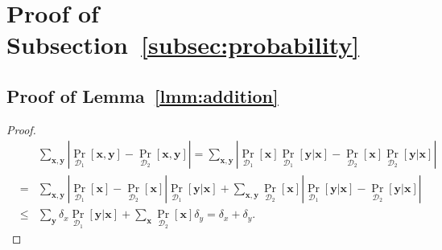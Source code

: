 \documentclass[letterpaper,11pt]{article}
\newcommand{\cald}{\mathcal{D}}
\newcommand{\bfx}{\mathbf{x}}
\newcommand{\bfy}{\mathbf{y}}
\begin{document}
{}

\newpage
\appendix
\noindent {\bf\Large \appendixname}

\section{Proof of Subsection~\ref{subsec:probability}}\label{apx:probability}

\subsection{Proof of Lemma~\ref{lmm:addition}}
\begin{proof}
  \begin{eqnarray*}
    &&
    \sum_{\bfx,\bfy}\left|\Pr_{\cald_1}[\bfx,\bfy]-\Pr_{\cald_2}[\bfx,\bfy]\right|
    =
    \sum_{\bfx,\bfy}\left|\Pr_{\cald_1}[\bfx]\Pr_{\cald_1}[\bfy|\bfx]-\Pr_{\cald_2}[\bfx]\Pr_{\cald_2}[\bfy|\bfx]\right|\\
    &=&
    \sum_{\bfx,\bfy}\left|\Pr_{\cald_1}[\bfx]-\Pr_{\cald_2}[\bfx]\right|\Pr_{\cald_1}[\bfy|\bfx]
    +\sum_{\bfx,\bfy}\Pr_{\cald_2}[\bfx]\left|\Pr_{\cald_1}[\bfy|\bfx]-\Pr_{\cald_2}[\bfy|\bfx]\right|\\
    &\leq&
    \sum_{\bfy}\delta_x \Pr_{\cald_1}[\bfy|\bfx] + \sum_{\bfx}\Pr_{\cald_2}[\bfx]\delta_y
    =
    \delta_x+\delta_y.
  \end{eqnarray*}
\end{proof}
\end{document}

